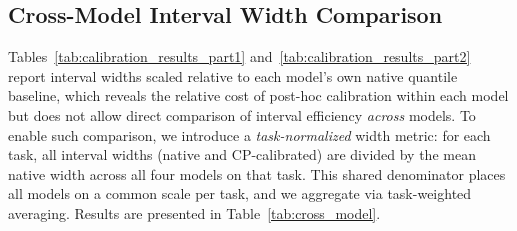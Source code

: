 \documentclass[12pt, a4paper]{article}
\begin{document}
\subsection{Cross-Model Interval Width Comparison}
Tables~\ref{tab:calibration_results_part1} and~\ref{tab:calibration_results_part2} report interval widths scaled relative to each model's own native quantile baseline, which reveals the relative cost of post-hoc calibration within each model but does not allow direct comparison of interval efficiency \textit{across} models. To enable such comparison, we introduce a \textit{task-normalized} width metric: for each task, all interval widths (native and CP-calibrated) are divided by the mean native width across all four models on that task. This shared denominator places all models on a common scale per task, and we aggregate via task-weighted averaging. Results are presented in Table~\ref{tab:cross_model}.
\end{document}

